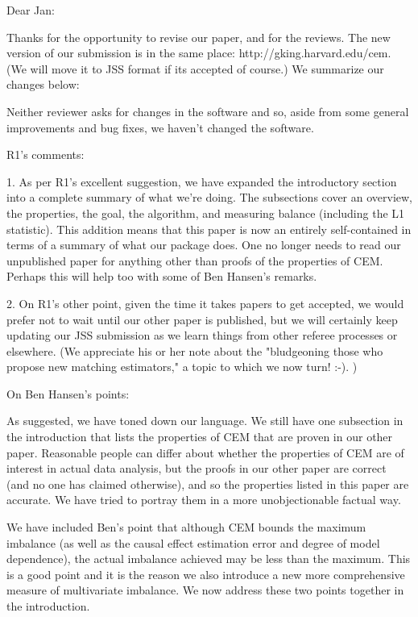 
Dear Jan:

Thanks for the opportunity to revise our paper, and for the reviews.
The new version of our submission is in the same place:
http://gking.harvard.edu/cem.  (We will move it to JSS format if its
accepted of course.)  We summarize our changes below:

Neither reviewer asks for changes in the software and so, aside from
some general improvements and bug fixes, we haven't changed the
software.

R1's comments:

1. As per R1's excellent suggestion, we have expanded the introductory
section into a complete summary of what we're doing.  The subsections
cover an overview, the properties, the goal, the algorithm, and
measuring balance (including the L1 statistic).  This addition means
that this paper is now an entirely self-contained in terms of a
summary of what our package does.  One no longer needs to read our
unpublished paper for anything other than proofs of the properties of
CEM.  Perhaps this will help too with some of Ben Hansen's remarks.

2. On R1's other point, given the time it takes papers to get
accepted, we would prefer not to wait until our other paper is
published, but we will certainly keep updating our JSS submission as
we learn things from other referee processes or elsewhere.  (We
appreciate his or her note about the "bludgeoning those who propose
new matching estimators," a topic to which we now turn!  :-). )

On Ben Hansen's points:

As suggested, we have toned down our language.  We still have one
subsection in the introduction that lists the properties of CEM that
are proven in our other paper.  Reasonable people can differ about
whether the properties of CEM are of interest in actual data analysis,
but the proofs in our other paper are correct (and no one has claimed
otherwise), and so the properties listed in this paper are accurate.
We have tried to portray them in a more unobjectionable factual way.

We have included Ben's point that although CEM bounds the maximum
imbalance (as well as the causal effect estimation error and degree of
model dependence), the actual imbalance achieved may be less than the
maximum.  This is a good point and it is the reason we also introduce
a new more comprehensive measure of multivariate imbalance.  We now
address these two points together in the introduction.

